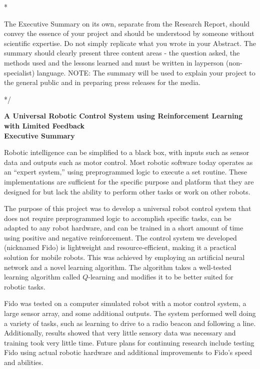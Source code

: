 \documentclass[letterpaper,12pt]{article}
\begin{document}
\/*

The Executive Summary on its own, separate from the Research Report, should convey the essence of your project and should be understood by someone without scientific expertise. Do not simply replicate what you wrote in your Abstract. The summary should clearly present three content areas - the question asked, the methods used and the lessons learned and must be written in layperson (non-specialist) language. NOTE: The summary will be used to explain your project to the general public and in preparing press releases for the media.

*/

\begin{center}
	{\Large
	\textbf{A Universal Robotic Control System using Reinforcement Learning with Limited Feedback}}\\
	\vspace{1cm}
	{\large \textbf{Executive Summary}}
\end{center}

\noindent

Robotic intelligence can be simplified to a black box, with inputs such as sensor data and outputs such as motor control.  Most robotic software today operates as an ``expert system,'' using preprogrammed logic to execute a set routine.  These implementations are sufficient for the specific purpose and platform that they are designed for but lack the ability to perform other tasks or work on other robots.

The purpose of this project was to develop a universal robot control system that does not require preprogrammed logic to accomplish specific tasks, can be adapted to any robot hardware, and can be trained in a short amount of time using positive and negative reinforcement.  The control system we developed (nicknamed Fido) is lightweight and resource-efficient, making it a practical solution for mobile robots.  This was achieved by employing an artificial neural network and a novel learning algorithm.  The algorithm takes a well-tested learning algorithm called $Q$-learning and modifies it to be better suited for robotic tasks.

Fido was tested on a computer simulated robot with a motor control system, a large sensor array, and some additional outputs.  The system performed well doing a variety of tasks, such as learning to drive to a radio beacon and following a line.  Additionally, results showed that very little sensory data was necessary and training took very little time.  Future plans for continuing research include testing Fido using actual robotic hardware and additional improvements to Fido's speed and abilities.
\end{document}
